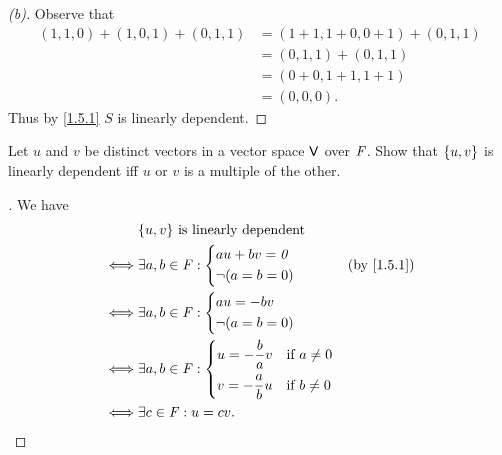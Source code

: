 \begin{proof}[(b)]
	Observe that
	\begin{align*}
		(1, 1, 0) + (1, 0, 1) + (0, 1, 1) & = (1 + 1, 1 + 0, 0 + 1) + (0, 1, 1) \\
		                                  & = (0, 1, 1) + (0, 1, 1)             \\
		                                  & = (0 + 0, 1 + 1, 1 + 1)             \\
		                                  & = (0, 0, 0).
	\end{align*}
	Thus by \cref{1.5.1} \(S\) is linearly dependent.
\end{proof}

\begin{ex}\label{ex:1.5.9}
	Let \(u\) and \(v\) be distinct vectors in a vector space \(\mathsf{V}\) over \(\mathit{F}\).
	Show that \(\left\lbrace u, v\right\rbrace\) is linearly dependent iff \(u\) or \(v\) is a multiple of the other.
\end{ex}

\begin{proof}[]
	We have
	\begin{align*}
		     & \set{u, v} \text{ is linearly dependent}                       \\
		\iff & \exists a, b \in \F : \begin{dcases}
			                             au + bv = \zv \\
			                             \lnot (a = b = 0)
		                             \end{dcases}        &  & \by{1.5.1}      \\
		\iff & \exists a, b \in \F : \begin{dcases}
			                             au = -bv \\
			                             \lnot (a = b = 0)
		                             \end{dcases}                         \\
		\iff & \exists a, b \in \F : \begin{dcases}
			                             u = -\frac{b}{a} v & \text{if } a \neq 0 \\
			                             v = -\frac{a}{b} u & \text{if } b \neq 0
		                             \end{dcases} \\
		\iff & \exists c \in \F : u = cv.
	\end{align*}
\end{proof}

